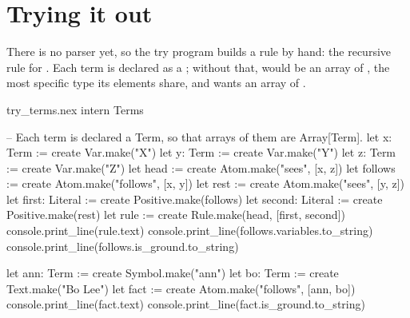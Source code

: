 \section{Trying it out}

There is no parser yet, so the try program builds a rule by hand: the
recursive rule for . Each term is declared as a ;
without that, \code{[x, z]} would be an array of , the most
specific type its elements share, and  wants an array of
.

\begin{tryit}{try_terms.nex}
intern Terms

-- Each term is declared a Term, so that arrays of them are Array[Term].
let x: Term := create Var.make("X")
let y: Term := create Var.make("Y")
let z: Term := create Var.make("Z")
let head := create Atom.make("sees", [x, z])
let follows := create Atom.make("follows", [x, y])
let rest := create Atom.make("sees", [y, z])
let first: Literal := create Positive.make(follows)
let second: Literal := create Positive.make(rest)
let rule := create Rule.make(head, [first, second])
console.print_line(rule.text)
console.print_line(follows.variables.to_string)
console.print_line(follows.is_ground.to_string)

let ann: Term := create Symbol.make("ann")
let bo: Term := create Text.make("Bo Lee")
let fact := create Atom.make("follows", [ann, bo])
console.print_line(fact.text)
console.print_line(fact.is_ground.to_string)
\end{tryit}
